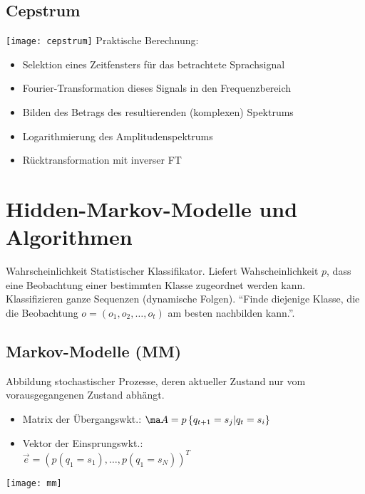 \documentclass[german,color,6pt]{latex4ei/latex4ei_sheet}
\begin{document}
\begin{sectionbox}
	\subsection{Cepstrum}
	\texttt{[image: cepstrum]}
	Praktische Berechnung:
	\begin{itemize}
		\item Selektion eines Zeitfensters für das betrachtete Sprachsignal
		\item Fourier-Transformation dieses Signals in den Frequenzbereich
		\item Bilden des Betrags des resultierenden (komplexen) Spektrums
		\item Logarithmierung des Amplitudenspektrums
		\item Rücktransformation mit inverser FT
	\end{itemize}

\end{sectionbox}

\columnbreak

\section{Hidden-Markov-Modelle und Algorithmen}
\begin{symbolbox}Wahrscheinlichkeit
Statistischer Klassifikator. Liefert Wahscheinlichkeit $p$, dass eine Beobachtung einer bestimmten Klasse zugeordnet werden kann. Klassifizieren ganze Sequenzen (dynamische Folgen). "`Finde diejenige Klasse, die die Beobachtung $o=(o_1, o_2, \dots , o_t)$ am besten nachbilden kann."'.
\end{symbolbox}

\begin{sectionbox}
	\subsection{Markov-Modelle (MM)}
	Abbildung stochastischer Prozesse, deren aktueller Zustand nur vom vorausgegangenen Zustand abhängt.
	\begin{itemize}
		\item Matrix der Übergangswkt.: $\ma A = p \left\{ q_{t+1} = s_j | q_t = s_i \right\}$
		\item Vektor der Einsprungswkt.: \\ $\vec e = (p(q_1 = s_1), \dots , p(q_1 = s_N))^T$
	\end{itemize}
	\texttt{[image: mm]}
\end{sectionbox}
\end{document}
